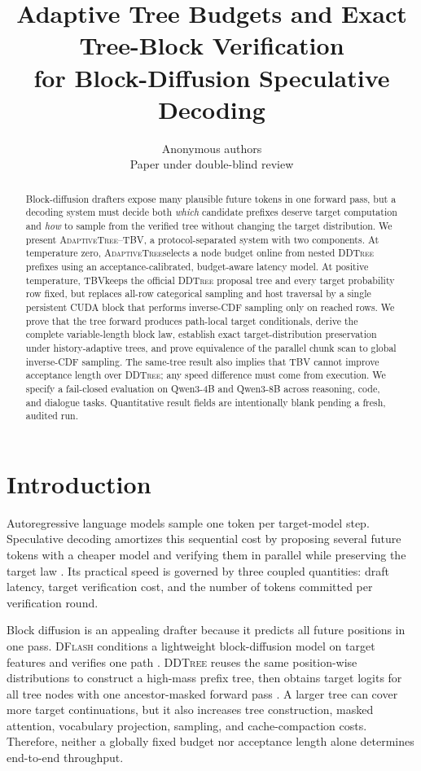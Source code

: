 \documentclass{article}
\title{Adaptive Tree Budgets and Exact Tree-Block Verification\\
for Block-Diffusion Speculative Decoding}
\author{Anonymous authors\\
Paper under double-blind review}
\newcommand{\TBV}{\textnormal{\textsc{TBV}}}
\newcommand{\AdaptiveTree}{\textnormal{\textsc{AdaptiveTree}}}
\newcommand{\DFlash}{\textnormal{\textsc{DFlash}}}
\newcommand{\DDTree}{\textnormal{\textsc{DDTree}}}
\newcommand{\method}{\textnormal{\textsc{AdaptiveTree--TBV}}}
\begin{document}
\maketitle

\begin{abstract}
Block-diffusion drafters expose many plausible future tokens in one forward pass, but a decoding system must decide both \emph{which} candidate prefixes deserve target computation and \emph{how} to sample from the verified tree without changing the target distribution.  We present \method, a protocol-separated system with two components.  At temperature zero, \AdaptiveTree selects a node budget online from nested \DDTree{} prefixes using an acceptance-calibrated, budget-aware latency model.  At positive temperature, \TBV keeps the official \DDTree{} proposal tree and every target probability row fixed, but replaces all-row categorical sampling and host traversal by a single persistent CUDA block that performs inverse-CDF sampling only on reached rows.  We prove that the tree forward produces path-local target conditionals, derive the complete variable-length block law, establish exact target-distribution preservation under history-adaptive trees, and prove equivalence of the parallel chunk scan to global inverse-CDF sampling.  The same-tree result also implies that \TBV{} cannot improve acceptance length over \DDTree; any speed difference must come from execution.  We specify a fail-closed evaluation on Qwen3-4B and Qwen3-8B across reasoning, code, and dialogue tasks.  Quantitative result fields are intentionally blank pending a fresh, audited run.
\end{abstract}

\section{Introduction}

Autoregressive language models sample one token per target-model step.  Speculative decoding amortizes this sequential cost by proposing several future tokens with a cheaper model and verifying them in parallel while preserving the target law \citep{leviathan2023fast,chen2023accelerating}.  Its practical speed is governed by three coupled quantities: draft latency, target verification cost, and the number of tokens committed per verification round.

Block diffusion is an appealing drafter because it predicts all future positions in one pass.  \DFlash{} conditions a lightweight block-diffusion model on target features and verifies one path \citep{chen2026dflash}.  \DDTree{} reuses the same position-wise distributions to construct a high-mass prefix tree, then obtains target logits for all tree nodes with one ancestor-masked forward pass \citep{ringel2026ddtree}.  A larger tree can cover more target continuations, but it also increases tree construction, masked attention, vocabulary projection, sampling, and cache-compaction costs.  Therefore, neither a globally fixed budget nor acceptance length alone determines end-to-end throughput.
\end{document}
